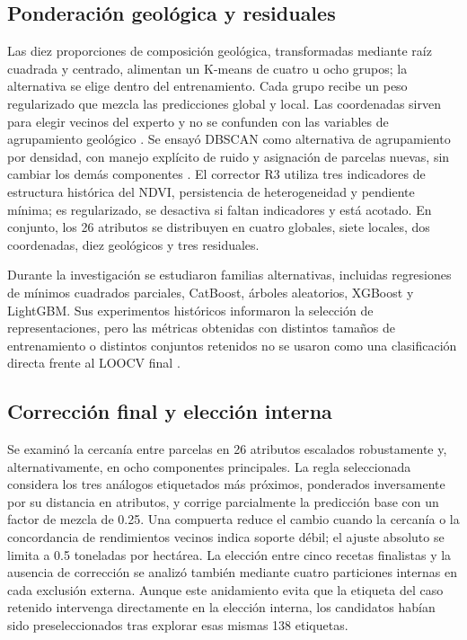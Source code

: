 \subsection*{Ponderación geológica y residuales}
Las diez proporciones de composición geológica, transformadas mediante raíz cuadrada y centrado, alimentan un K-means de cuatro u ocho grupos; la alternativa se elige dentro del entrenamiento. Cada grupo recibe un peso regularizado que mezcla las predicciones global y local. Las coordenadas sirven para elegir vecinos del experto y no se confunden con las variables de agrupamiento geológico \parencite{MacQueen1967}. Se ensayó DBSCAN como alternativa de agrupamiento por densidad, con manejo explícito de ruido y asignación de parcelas nuevas, sin cambiar los demás componentes \parencite{Ester1996DBSCAN}. El corrector R3 utiliza tres indicadores de estructura histórica del NDVI, persistencia de heterogeneidad y pendiente mínima; es regularizado, se desactiva si faltan indicadores y está acotado. En conjunto, los 26 atributos se distribuyen en cuatro globales, siete locales, dos coordenadas, diez geológicos y tres residuales.

Durante la investigación se estudiaron familias alternativas, incluidas regresiones de mínimos cuadrados parciales, CatBoost, árboles aleatorios, XGBoost y LightGBM. Sus experimentos históricos informaron la selección de representaciones, pero las métricas obtenidas con distintos tamaños de entrenamiento o distintos conjuntos retenidos no se usaron como una clasificación directa frente al LOOCV final \parencite{Wold2001,CatBoost2018,Geurts2006,XGBoost2016,LightGBM2017}.

\subsection*{Corrección final y elección interna}
Se examinó la cercanía entre parcelas en 26 atributos escalados robustamente y, alternativamente, en ocho componentes principales. La regla seleccionada considera los tres análogos etiquetados más próximos, ponderados inversamente por su distancia en atributos, y corrige parcialmente la predicción base con un factor de mezcla de 0.25. Una compuerta reduce el cambio cuando la cercanía o la concordancia de rendimientos vecinos indica soporte débil; el ajuste absoluto se limita a 0.5 toneladas por hectárea. La elección entre cinco recetas finalistas y la ausencia de corrección se analizó también mediante cuatro particiones internas en cada exclusión externa. Aunque este anidamiento evita que la etiqueta del caso retenido intervenga directamente en la elección interna, los candidatos habían sido preseleccionados tras explorar esas mismas 138 etiquetas.
